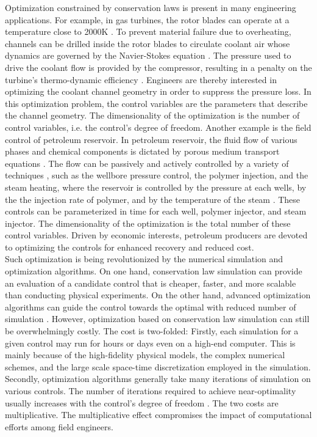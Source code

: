 Optimization constrained by conservation laws is present in many engineering applications.
For example, in gas turbines, the rotor blades can operate at a temperature close to 2000K \cite{airfoil cooling}.
To prevent material failure due to overheating, channels can be drilled inside the rotor blades
to circulate coolant air whose dynamics are governed by the Navier-Stokes equation 
\cite{ubend rans opt 1}. The pressure
used to drive the coolant flow is provided by the compressor, resulting in a penalty on the 
turbine's thermo-dynamic efficiency \cite{ubend rans opt 2}. 
Engineers are thereby interested in optimizing the coolant
channel geometry in order to suppress the pressure loss. In this optimization problem, the control variables
are the parameters that describe the channel geometry. The dimensionality of the optimization is the
number of control variables, i.e. the control's degree of freedom.
Another example is the field control of petroleum
reservoir. In petroleum reservoir, the fluid flow of various phases and chemical components 
is dictated by porous medium transport equations \cite{reservoir sim book}. The flow can be passively and actively controlled by a variety of techniques \cite{first reservoir opt},
such as the wellbore pressure control, the polymer injection, and the steam heating,
where the reservoir is controlled by the pressure at each wells, by the the injection rate of polymer, and by the temperature of the steam \cite{secondary recovery review}.
These controls can be parameterized in time for each well, polymer injector, and steam injector. The dimensionality of the optimization is
the total number of these control variables.
Driven by economic interests, petroleum producers are 
devoted to optimizing the controls for enhanced recovery and reduced cost.\\

Such optimization is being revolutionized by the numerical simulation and optimization
algorithms. On one hand, conservation law simulation can provide an evaluation of a candidate control
that is cheaper, faster, and more scalable than conducting physical experiments. 
On the other hand, advanced optimization algorithms can guide 
the control towards the optimal with reduced number of simulation \cite{quasiNewton, gradfreereview, LBFGS, trustregionconn, genetic algo, particle swarm, cuckoo, review EI}.
However, optimization based on conservation law simulation can still be overwhelmingly costly. 
The cost is two-folded: Firstly, each simulation for a given control may run for hours or days even on a high-end
computer. This is mainly because of the high-fidelity physical models, the complex numerical schemes, and the large scale space-time 
discretization employed in the simulation. Secondly, optimization algorithms generally take many iterations of simulation on
various controls. The number of iterations required to achieve near-optimality usually 
increases with the control's degree of freedom \cite{opt via sim review}. The two costs are multiplicative.
The multiplicative effect compromises the impact of computational efforts among field engineers.\\

